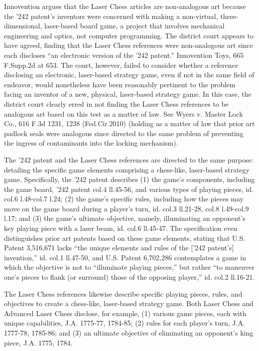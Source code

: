 Innovention argues that the Laser Chess articles are non-analogous art because
the '242 patent's inventors were concerned with making a non-virtual,
three-dimensional, laser-based board game, a project that involves mechanical
engineering and optics, not computer programming. The district court appears to
have agreed, finding that the Laser Chess references were non-analogous art
since each discloses ``an electronic version of the '242 patent.'' Innovention
Toys, 665 F.Supp.2d at 653. The court, however, failed to consider whether a
reference disclosing an electronic, laser-based strategy game, even if not in
the same field of endeavor, would nonetheless have been reasonably pertinent to
the problem facing an inventor of a new, physical, laser-based strategy game.
In this case, the district court clearly erred in not finding the Laser Chess
references to be analogous art based on this test as a matter of law. See Wyers
v. Master Lock Co., 616 F.3d 1231, 1238 (Fed.Cir.2010) (holding as a matter of
law that prior art padlock seals were analogous since directed to the same
problem of preventing the ingress of contaminants into the locking mechanism).

The '242 patent and the Laser Chess references are directed to the same purpose:
detailing the specific game elements comprising a chess-like, laser-based
strategy game. Specifically, the '242 patent describes (1) the game's
components, including the game board, '242 patent col.4 ll.45-56, and various
types of playing pieces, id. col.6 l.48-col.7 l.24; (2) the game's specific
rules, including how the pieces may move on the game board during a player's
turn, id. col.3 ll.21-28, col.8 l.49-col.9 l.17; and (3) the game's ultimate
objective, namely, illuminating an opponent's key playing piece with a laser
beam, id. col.6 ll.45-47. The specification even distinguishes prior art
patents based on these game elements, stating that U.S. Patent 3,516,671 lacks
``the unique elements and rules of the ['242 patent's] invention,'' id. col.1
ll.47-50, and U.S. Patent 6,702,286 contemplates a game in which the objective
is not to ``illuminate playing pieces,'' but rather ``to maneuver one's pieces
to flank (or surround) those of the opposing player,'' id. col.2 ll.16-21.

The Laser Chess references likewise describe specific playing pieces, rules, and
objectives to create a chess-like, laser-based strategy game. Both Laser Chess
and Advanced Laser Chess disclose, for example, (1) various game pieces, each
with unique capabilities, J.A. 1775-77, 1784-85; (2) rules for each player's
turn, J.A. 1777-78, 1785-86; and (3) an ultimate objective of eliminating an
opponent's king piece, J.A. 1775, 1784.

